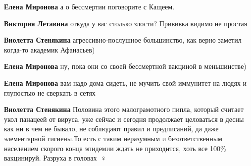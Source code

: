 \begin{itemize}
\begin{itemize}
\textbf{Елена Миронова} а о бессмертии поговорите с Кащеем.

 
\textbf{Виктория Летавина} откуда у вас столько злости? Прививка видимо не простая 🧐

 
\textbf{Виолетта Стенякина} агрессивно-послушное большинство, как верно заметил когда-то академик Афанасьев)

 
\textbf{Елена Миронова} ну, пока они со своей бессмертной вакциной в меньшинстве)

 
\textbf{Елена Миронова} вам надо дома сидеть, не мучить свой иммунитет на людях и глупостью не сверкать в сетях

 
\textbf{Виолетта Стенякина} Половина этого малограмотного пипла, который
считает укол панацеей от вируса, уже сейчас и сегодня продолжает целоваться в
десны как ни в чем не бывало, не соблюдают правил и предписаний, да даже
элементарной гигиены.То есть с таким неразумным и безответственным населением
скорого конца эпидемии ждать не приходится, хоть все 100\% вакцинируй. Разруха в
головах 🤦♀️


\end{itemize}
\end{itemize}
